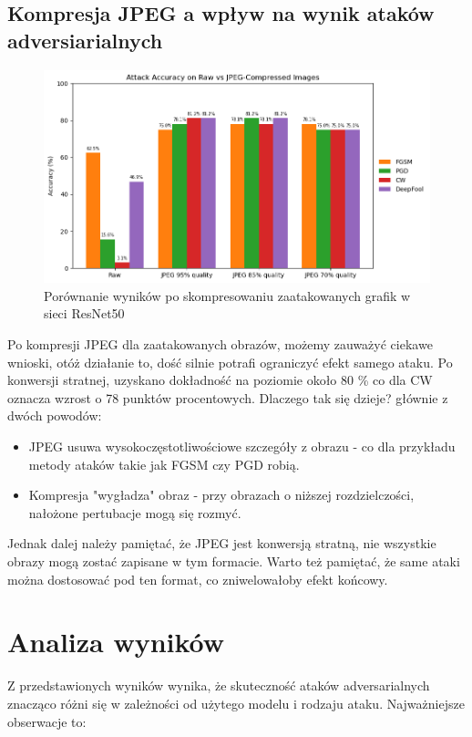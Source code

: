 \documentclass{article}
\begin{document}
\subsection{Kompresja JPEG a wpływ na wynik ataków adversiarialnych}

\begin{figure} [H]
    \centering
    \includegraphics[width=1\textwidth]{jpeg_accuracy.png}
    \caption{Porównanie wyników po skompresowaniu zaatakowanych grafik w sieci ResNet50}
    \label{fig:enter-label}
\end{figure}

Po kompresji JPEG dla zaatakowanych obrazów, możemy zauważyć ciekawe wnioski, otóż działanie to, dość silnie potrafi ograniczyć efekt samego ataku. Po konwersji stratnej, uzyskano dokładność na poziomie około 80 \% co dla CW oznacza wzrost o 78 punktów procentowych. Dlaczego tak się dzieje? głównie z dwóch powodów:
\begin{itemize}
    \item JPEG usuwa wysokoczęstotliwościowe szczegóły z obrazu - co dla przykładu metody  ataków takie jak FGSM czy PGD robią.
    \item Kompresja "wygładza" obraz - przy obrazach o niższej rozdzielczości, nałożone pertubacje mogą się rozmyć.
\end{itemize}
Jednak dalej należy pamiętać, że JPEG jest konwersją stratną, nie wszystkie obrazy mogą zostać zapisane w tym formacie. Warto też pamiętać, że same ataki można dostosować pod ten format, co zniwelowałoby efekt końcowy.

\section{Analiza wyników}

Z przedstawionych wyników wynika, że skuteczność ataków adversarialnych znacząco różni się w zależności od użytego modelu i rodzaju ataku. Najważniejsze obserwacje to:
\end{document}
